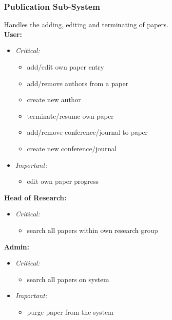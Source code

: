 \documentclass{article}
\begin{document}
			\subsubsection{Publication Sub-System}\label{subsubsec:priority-paper}
				Handles the adding, editing and terminating of papers.\\
				[3mm]
				\textbf{User:}
				\begin{itemize}
					\item \textit{Critical:}
					\begin{itemize}
						\item add/edit own paper entry
						\item add/remove authors from a paper
						\item create new author
						\item terminate/resume own paper
						\item add/remove conference/journal to paper
						\item create new conference/journal
					\end{itemize}
					
					\item \textit{Important:}
					\begin{itemize}
						\item edit own paper progress
					\end{itemize}
				\end{itemize}
				\textbf{Head of Research:}
				\begin{itemize}
					\item \textit{Critical:}
					\begin{itemize}
						\item search all papers within own research group
					\end{itemize}
				\end{itemize}
				\textbf{Admin:}
				\begin{itemize}
					\item \textit{Critical:}
					\begin{itemize}
						\item search all papers on system
					\end{itemize}
					
					\item \textit{Important:}
					\begin{itemize}
						\item purge paper from the system
					\end{itemize}
				\end{itemize}
\end{document}
